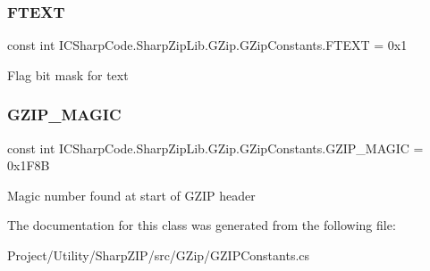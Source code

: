 \subsubsection{\texorpdfstring{F\+T\+E\+XT}{FTEXT}}
{\footnotesize\ttfamily const int I\+C\+Sharp\+Code.\+Sharp\+Zip\+Lib.\+G\+Zip.\+G\+Zip\+Constants.\+F\+T\+E\+XT = 0x1}



Flag bit mask for text 

\mbox{\label{class_i_c_sharp_code_1_1_sharp_zip_lib_1_1_g_zip_1_1_g_zip_constants_a1643cc3b256ffabb5daaeef676308808}} 
\subsubsection{\texorpdfstring{G\+Z\+I\+P\+\_\+\+M\+A\+G\+IC}{GZIP\_MAGIC}}
{\footnotesize\ttfamily const int I\+C\+Sharp\+Code.\+Sharp\+Zip\+Lib.\+G\+Zip.\+G\+Zip\+Constants.\+G\+Z\+I\+P\+\_\+\+M\+A\+G\+IC = 0x1\+F8B}



Magic number found at start of G\+Z\+IP header 



The documentation for this class was generated from the following file\+:\begin{DoxyCompactItemize}
\item 
Project/\+Utility/\+Sharp\+Z\+I\+P/src/\+G\+Zip/G\+Z\+I\+P\+Constants.\+cs\end{DoxyCompactItemize}
